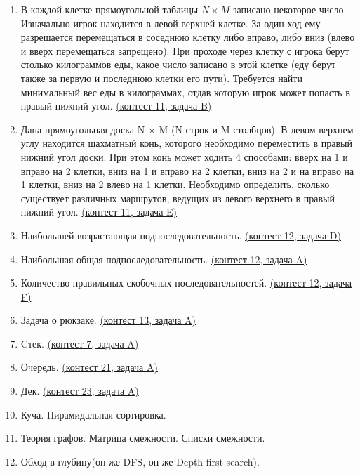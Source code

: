 \documentclass[a4paper,12pt]{article}
\begin{document}
\begin{enumerate}
\item В каждой клетке прямоугольной таблицы $N\times M$ записано некоторое число. Изначально игрок находится в левой верхней клетке. За один ход ему разрешается перемещаться в соседнюю клетку либо вправо, либо вниз (влево и вверх перемещаться запрещено). При проходе через клетку с игрока берут столько килограммов еды, какое число записано в этой клетке (еду берут также за первую и последнюю клетки его пути). Требуется найти минимальный вес еды в килограммах, отдав которую игрок может попасть в правый нижний угол. \href{https://informatics.msk.ru/mod/statements/view3.php?chapterid=944}{(контест 11, задача B)}
\item Дана прямоугольная доска N × M (N строк и M столбцов). В левом верхнем углу находится шахматный конь, которого необходимо переместить в правый нижний угол доски. При этом конь может ходить 4 способами: вверх на 1 и вправо на 2 клетки, вниз на 1 и вправо на 2 клетки, вниз на 2 и на вправо на 1 клетки, вниз на 2 влево на 1 клетки. Необходимо определить, сколько существует различных маршрутов, ведущих из левого верхнего в правый нижний угол. \href{https://informatics.msk.ru/mod/statements/view3.php?chapterid=2962}{(контест 11, задача E)}
\item Наибольшей возрастающая подпоследовательность. \href{https://informatics.msk.ru/mod/statements/view3.php?chapterid=205}{(контест 12, задача D)}
\item Наибольшая общая подпоследовательность. \href{https://informatics.msk.ru/mod/statements/view3.php?chapterid=204}{(контест 12, задача A)}
\item Количество правильных скобочных последовательностей. \href{https://informatics.msk.ru/mod/statements/view3.php?chapterid=3005}{(контест 12, задача F)}
\item Задача о рюкзаке. \href{https://informatics.msk.ru/mod/statements/view3.php?chapterid=3089}{(контест 13, задача A)}
\item Cтек. \href{https://informatics.msk.ru/mod/statements/view3.php?chapterid=55}{(контест 7, задача A)}
\item Очередь. \href{https://informatics.msk.ru/mod/statements/view3.php?chapterid=57}{(контест 21, задача A)}
\item Дек. \href{https://informatics.msk.ru/mod/statements/view3.php?chapterid=60}{(контест 23, задача A)}
\item Куча. Пирамидальная сортировка.
\item Теория графов. Матрица смежности. Списки смежности.
\item Обход в глубину(он же DFS, он же Depth-first search).

\end{enumerate}
\end{document}
